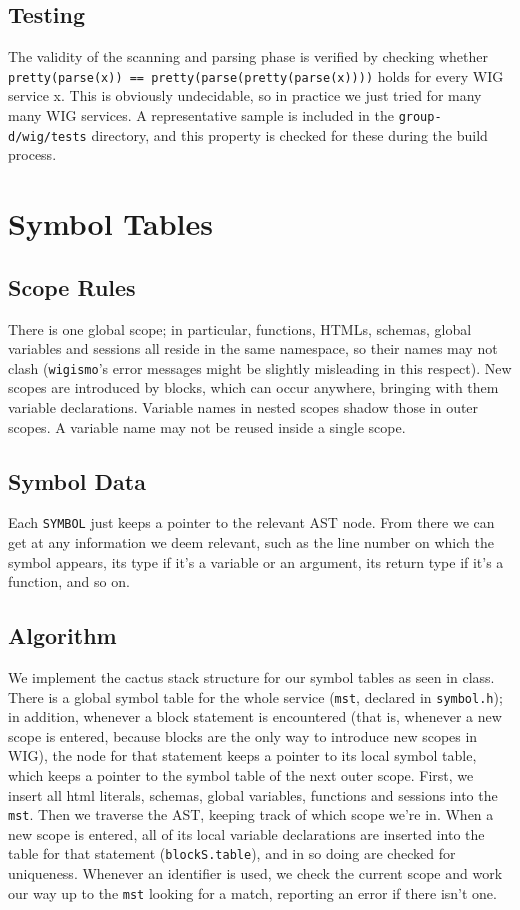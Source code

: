 \documentclass{WigReport}
\begin{document}
\subsection{Testing}
The validity of the scanning and parsing phase is verified by checking
whether {\tt pretty(parse(x)) == pretty(parse(pretty(parse(x))))} holds
for every WIG service x. This is obviously undecidable, so in practice we
just tried for many many WIG services. A representative sample is included
in the {\tt group-d/wig/tests} directory, and this property is checked for
these during the build process.

\clearpage

\section{Symbol Tables}
\subsection{Scope Rules}
There is one global scope; in particular, functions, HTMLs, schemas,
global variables and sessions all reside in the same namespace, so their
names may not clash ({\tt wigismo}'s error messages might be slightly
misleading in this respect). New scopes are introduced by blocks, which
can occur anywhere, bringing with them variable declarations. Variable
names in nested scopes shadow those in outer scopes. A variable name may
not be reused inside a single scope.

\subsection{Symbol Data}
Each {\tt SYMBOL} just keeps a pointer to the relevant AST node. From there
we can get at any information we deem relevant, such as the line number on
which the symbol appears, its type if it's a variable or an argument, its
return type if it's a function, and so on.

\subsection{Algorithm}
We implement the cactus stack structure for our symbol tables as seen in 
class. There is a global symbol table for the whole service ({\tt mst}, 
declared in {\tt symbol.h}); in addition, whenever a block statement is 
encountered (that is, whenever a new scope is entered, because blocks are 
the only way to introduce new scopes in WIG), the node for that statement 
keeps a pointer to its local symbol table, which keeps a pointer to the
symbol table of the next outer scope. First, we insert all html literals,
schemas, global variables, functions and sessions into the {\tt mst}. Then
we traverse the AST, keeping track of which scope we're in. When a new
scope is entered, all of its local variable declarations are inserted into
the table for that statement ({\tt blockS.table}), and in so doing are
checked for uniqueness. Whenever an identifier is used, we check the
current scope and work our way up to the {\tt mst} looking for a match,
reporting an error if there isn't one.
\end{document}
